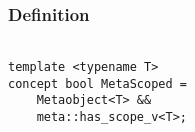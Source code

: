 
\subsubsection{Definition}

\begin{verbatim}

template <typename T>
concept bool MetaScoped =
	Metaobject<T> &&
	meta::has_scope_v<T>;

\end{verbatim}
